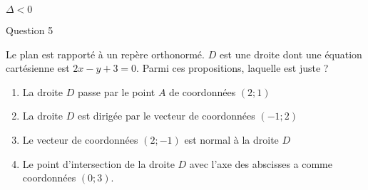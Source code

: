 \begin{enumerate}[label=\alph*.]
\begin{center}
          \begin{extern} %
          \end{extern}
     \end{center}
     \begin{center}
          $ \Delta <0$
     \end{center}
     \newpar
\end{enumerate}
\begin{h2}Question 5\end{h2}
Le plan est rapporté à un repère orthonormé.
\newpar
$D$ est une droite dont une équation cartésienne est $2x-y+3=0$.
\newpar
Parmi ces propositions, laquelle est juste ?
\newpar
\begin{enumerate}[label=\alph*.]
     \item
     La droite $D$ passe par le point $A$ de coordonnées $( 2;1 )$
     \item
     La droite $D$ est dirigée par le vecteur de coordonnées $(  - 1;2 )$
     \item
     Le vecteur de coordonnées $( 2; - 1 )$ est normal à la droite $D$
     \item
     Le point d'intersection de la droite  $D$ avec l'axe des abscisses a comme coordonnées $( 0;3 ).$
\end{enumerate}
